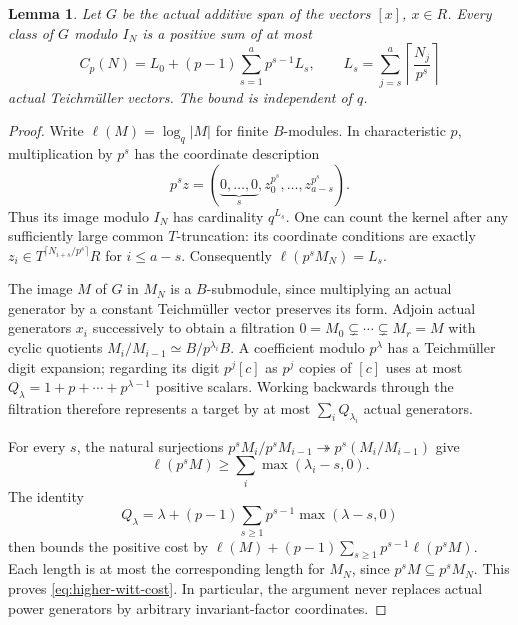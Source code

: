 \documentclass[11pt]{amsart}
\newtheorem{lemma}[theorem]{Lemma}
\theoremstyle{definition}
\numberwithin{equation}{section}
\begin{document}
\begin{lemma}\label{lem:higher-witt-coefficients}
Let $G$ be the actual additive span of the vectors $[x]$, $x\in R$.
Every class of $G$ modulo $I_N$ is a positive sum of at most
\begin{equation}\label{eq:higher-witt-cost}
 C_p(N)=L_0+(p-1)\sum_{s=1}^a p^{s-1}L_s,
 \qquad
 L_s=\sum_{j=s}^a\left\lceil\frac{N_j}{p^s}\right\rceil
\end{equation}
actual Teichm\"uller vectors. The bound is independent of $q$.
\end{lemma}
\begin{proof}
Write $\ell(M)=\log_q|M|$ for finite $B$-modules. In characteristic
$p$, multiplication by $p^s$ has the coordinate description
\[
 p^sz=(\underbrace{0,\ldots,0}_{s},
             z_0^{p^s},\ldots,z_{a-s}^{p^s}).
\]
Thus its image modulo $I_N$ has cardinality $q^{L_s}$.
One can count the kernel after any sufficiently large common
$T$-truncation: its coordinate conditions are exactly
$z_i\in T^{\lceil N_{i+s}/p^s\rceil}R$ for $i\le a-s$.
Consequently $\ell(p^sM_N)=L_s$.

The image $M$ of $G$ in $M_N$ is a $B$-submodule, since multiplying
an actual generator by a constant Teichm\"uller vector preserves its
form. Adjoin actual generators $x_i$ successively to obtain a
filtration $0=M_0\subsetneq\cdots\subsetneq M_r=M$ with cyclic
quotients $M_i/M_{i-1}\simeq B/p^{\lambda_i}B$.
A coefficient modulo $p^\lambda$ has a Teichm\"uller digit expansion;
regarding its digit $p^j[c]$ as $p^j$ copies of $[c]$ uses at most
$Q_\lambda=1+p+\cdots+p^{\lambda-1}$ positive scalars. Working
backwards through the filtration therefore represents a target by
at most $\sum_iQ_{\lambda_i}$ actual generators.

For every $s$, the natural surjections
$p^sM_i/p^sM_{i-1}\twoheadrightarrow p^s(M_i/M_{i-1})$ give
\[
 \ell(p^sM)\ge\sum_i\max(\lambda_i-s,0).
\]
The identity
\[
 Q_\lambda=\lambda+
   (p-1)\sum_{s\ge1}p^{s-1}\max(\lambda-s,0)
\]
then bounds the positive cost by
$\ell(M)+(p-1)\sum_{s\ge1}p^{s-1}\ell(p^sM)$.
Each length is at most the corresponding length for $M_N$, since
$p^sM\subseteq p^sM_N$. This proves
\eqref{eq:higher-witt-cost}. In particular, the argument never
replaces actual power generators by arbitrary invariant-factor
coordinates.
\end{proof}
\end{document}
